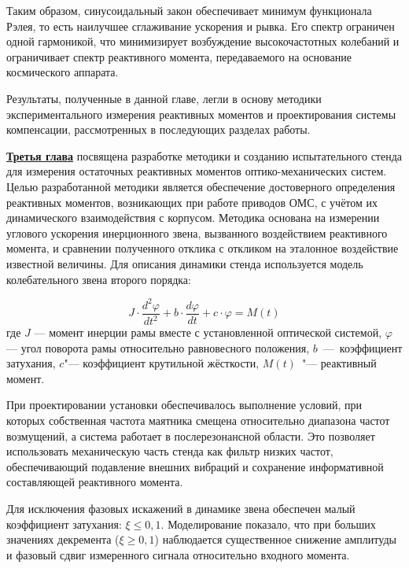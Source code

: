 Таким образом, синусоидальный закон обеспечивает минимум функционала Рэлея, то есть наилучшее сглаживание ускорения и рывка. Его спектр ограничен одной гармоникой, что минимизирует возбуждение высокочастотных колебаний и ограничивает спектр реактивного момента, передаваемого на основание космического аппарата.

Результаты, полученные в данной главе, легли в основу методики экспериментального измерения реактивных моментов и проектирования системы компенсации, рассмотренных в последующих разделах работы.



\underline{\textbf{Третья глава}} посвящена разработке методики и созданию испытательного стенда для измерения остаточных реактивных моментов оптико-механических систем.
Целью разработанной методики является обеспечение достоверного определения реактивных моментов, возникающих при работе приводов ОМС, с учётом их динамического взаимодействия с корпусом. Методика основана на измерении углового ускорения инерционного звена, вызванного воздействием реактивного момента, и сравнении полученного отклика с откликом на эталонное воздействие известной величины.
Для описания динамики стенда используется модель колебательного звена второго порядка:
\begin{samepage}
	\begin{equation*}
		\label{eq:stadeq}
		J\cdot \frac{d^2\varphi}{dt^2}+b \cdot \frac{d\varphi}{dt}+ c \cdot \varphi = M(t)
	\end{equation*}
	где \(J\) --- момент инерции рамы вместе с установленной оптической системой, \(\varphi\) --- угол поворота рамы относительно равновесного положения, \(b\)~---~коэффициент затухания, \(c\)"--- коэффициент крутильной жёсткости, \(M(t)\)~"--- реактивный момент.
	\end{samepage}


При проектировании установки обеспечивалось выполнение условий, при которых собственная частота маятника смещена относительно диапазона частот возмущений, а система работает в послерезонансной области. Это позволяет использовать механическую часть стенда как фильтр низких частот, обеспечивающий подавление внешних вибраций и сохранение информативной составляющей реактивного момента.

Для исключения фазовых искажений в динамике звена обеспечен малый коэффициент затухания: $\xi\leq 0,1$. Моделирование показало, что при больших значениях декремента ($\xi \geq 0,1 $) наблюдается существенное снижение амплитуды и фазовый сдвиг измеренного сигнала относительно входного момента.

